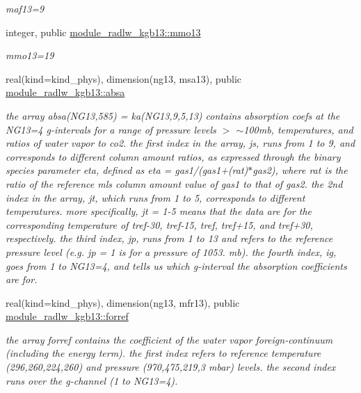 \begin{Indent}
\begin{DoxyCompactItemize}
\begin{DoxyCompactList}\small\item\em maf13=9 \end{DoxyCompactList}\item 
integer, public \hyperlink{group__module__radlw__kgbnn_gae513ce55829a57a0dbda77f570e4a619}{module\+\_\+radlw\+\_\+kgb13\+::mmo13}
\begin{DoxyCompactList}\small\item\em mmo13=19 \end{DoxyCompactList}\item 
real(kind=kind\+\_\+phys), dimension(ng13, msa13), public \hyperlink{group__module__radlw__kgbnn_ga22ce8d48ac3dceae1d52e80097fc2689}{module\+\_\+radlw\+\_\+kgb13\+::absa}
\begin{DoxyCompactList}\small\item\em the array absa(\+N\+G13,585) = ka(\+N\+G13,9,5,13) contains absorption coefs at the N\+G13=4 g-\/intervals for a range of pressure levels $>$ $\sim$100mb, temperatures, and ratios of water vapor to co2. the first index in the array, js, runs from 1 to 9, and corresponds to different column amount ratios, as expressed through the binary species parameter eta, defined as eta = gas1/(gas1+(rat)$\ast$gas2), where rat is the ratio of the reference mls column amount value of gas1 to that of gas2. the 2nd index in the array, jt, which runs from 1 to 5, corresponds to different temperatures. more specifically, jt = 1-\/5 means that the data are for the corresponding temperature of tref-\/30, tref-\/15, tref, tref+15, and tref+30, respectively. the third index, jp, runs from 1 to 13 and refers to the reference pressure level (e.\+g. jp = 1 is for a pressure of 1053. mb). the fourth index, ig, goes from 1 to N\+G13=4, and tells us which g-\/interval the absorption coefficients are for. \end{DoxyCompactList}\item 
real(kind=kind\+\_\+phys), dimension(ng13, mfr13), public \hyperlink{group__module__radlw__kgbnn_ga93c6546ef5f8cbfc4f63de29e1ba2452}{module\+\_\+radlw\+\_\+kgb13\+::forref}
\begin{DoxyCompactList}\small\item\em the array forref contains the coefficient of the water vapor foreign-\/continuum (including the energy term). the first index refers to reference temperature (296,260,224,260) and pressure (970,475,219,3 mbar) levels. the second index runs over the g-\/channel (1 to N\+G13=4). \end{DoxyCompactList}\item 

\end{DoxyCompactItemize}
\end{Indent}
